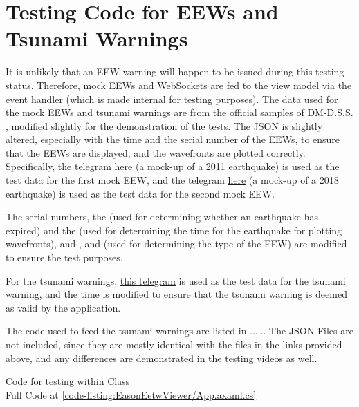 \section{Testing Code for EEWs and Tsunami Warnings}

It is unlikely that an EEW warning will happen to be issued during this testing status. Therefore, mock EEWs and WebSockets are fed to the view model via the event handler (which is made internal for testing purposes). The data used for the mock EEWs and tsunami warnings are from the official samples of DM-D.S.S. \autocite{dmdata-sample}, modified slightly for the demonstration of the tests. The JSON is slightly altered, especially with the time and the serial number of the EEWs, to ensure that the EEWs are displayed, and the wavefronts are plotted correctly. Specifically, the telegram \href{https://sample.dmdata.jp/conversion/json/schema/eew-information/vxse45_rjtd_20110311144810.json}{here} (a mock-up of a 2011 earthquake) is used as the test data for the first mock EEW, and the telegram \href{https://sample.dmdata.jp/conversion/json/schema/eew-information/vxse44_rjtd_20180906031016.json}{here} (a mock-up of a 2018 earthquake) is used as the test data for the second mock EEW.

The serial numbers, the  (used for determining whether an earthquake has expired) and the  (used for determining the time for the earthquake for plotting wavefronts), and ,  and  (used for determining the type of the EEW) are modified to ensure the test purposes.

For the tsunami warnings, \href{https://sample.dmdata.jp/conversion/json/schema/tsunami-information/vtse41_jpos_20110311144959.json}{this telegram} is used as the test data for the tsunami warning, and the time is modified to ensure that the tsunami warning is deemed as valid by the application.

The code used to feed the tsunami warnings are listed in ...... The JSON Files are not included, since they are mostly identical with the files in the links provided above, and any differences are demonstrated in the testing videos as well.

\begin{normallisting}
    \caption[Code for testing within  Class]{
        Code for testing within  Class \\
        Full Code at \autoref{code-listing:EasonEetwViewer/App.axaml.cs}}
    \label{code:testing-code}
\end{normallisting}

